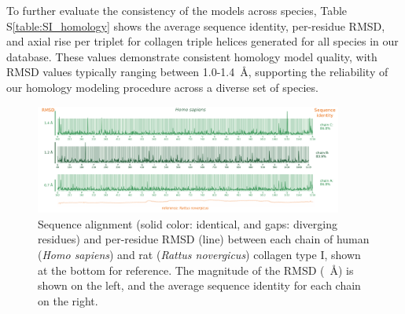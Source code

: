 \documentclass[10pt,letterpaper]{article}
\begin{document}
To further evaluate the consistency of the models across species, Table S\ref{table:SI_homology} shows the average sequence identity, per-residue RMSD, and axial rise per triplet for collagen triple helices generated for all species in our database. These values demonstrate consistent homology model quality, with RMSD values typically ranging between \SI{1.0}{}-\SI{1.4}{\angstrom}, supporting the reliability of our homology modeling procedure across a diverse set of species.

\captionsetup{labelformat = suppl}
\begin{figure}[!h]
    \centering
    \includegraphics[width=0.9\textwidth]{figures/rmsd_seqiden.png}
    \caption{Sequence alignment (solid color: identical, and gaps: diverging residues) and per-residue RMSD (line) between each chain of human (\textit{Homo sapiens}) and rat (\textit{Rattus novergicus}) collagen type I, shown at the bottom for reference. The magnitude of the RMSD (\SI{}{\angstrom}) is shown on the left, and the average sequence identity for each chain on the right.}
    \label{fig:SI_homology_rmsd_id}
\end{figure}
\end{document}
